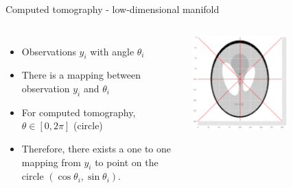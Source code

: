 \documentclass[aspectratio=169]{beamer}
\begin{document}
\begin{frame}[c]{Computed tomography - low-dimensional manifold}
    \begin{columns}
        \begin{itemize}
            \item Observations $y_i$  with angle $\theta_i$
            \item There is a mapping between observation $y_i$ and $\theta_i$
            \item For computed tomography, $\theta \in [0, 2\pi]$ (circle)
            \item Therefore, there exists a one to one mapping from $y_i$ to point on the circle $(\cos \theta_i, \sin \theta_i)$.
        \end{itemize}
        
        \includegraphics[width=0.6\textwidth]{phantom_many_theta.png}
        
    \end{columns}
\end{frame}
\end{document}
